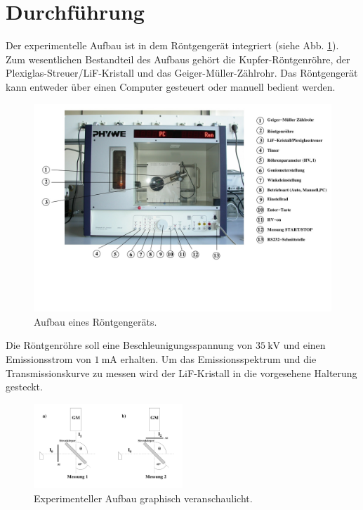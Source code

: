 \section{Durchführung}
\label{sec:Durchführung}
Der experimentelle Aufbau ist in dem Röntgengerät integriert (siehe Abb. \ref{fig:aufbau}).
Zum wesentlichen Bestandteil des Aufbaus gehört die Kupfer-Röntgenröhre, der Plexiglas-Streuer/LiF-Kristall und das Geiger-Müller-Zählrohr.
Das Röntgengerät kann entweder über einen Computer gesteuert oder manuell bedient werden.
\begin{figure}
    \centering
    \includegraphics[width=\textwidth]{content/data/aufbau.jpg}
    \caption{Aufbau eines Röntgengeräts. \cite[3]{anleitung}}
    \label{fig:aufbau}
\end{figure}
Die Röntgenröhre soll eine Beschleunigungsspannung von $\SI{35}{\kilo\volt}$ und einen Emissionsstrom von $\SI{1}{\milli\ampere}$ erhalten.
Um das Emissionsspektrum und die Transmissionskurve zu messen wird der LiF-Kristall in die vorgesehene Halterung gesteckt.
\begin{figure}
    \centering
    \includegraphics[width=0.5\textwidth]{content/data/aufbau2.jpg}
    \caption{Experimenteller Aufbau graphisch veranschaulicht. \cite[4]{anleitung}}
    \label{fig:aufbau2}
\end{figure}
